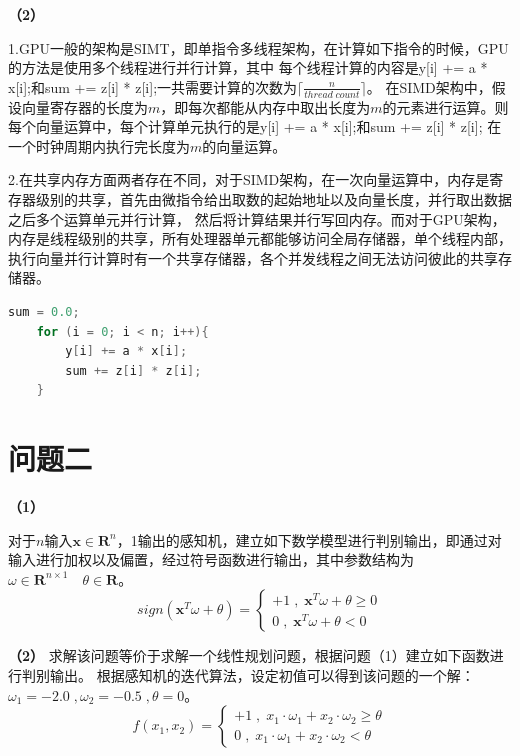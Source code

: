 \documentclass[12pt]{article}
\begin{document}
\textbf{（2）}

1.GPU一般的架构是SIMT，即单指令多线程架构，在计算如下指令的时候，GPU的方法是使用多个线程进行并行计算，其中
每个线程计算的内容是y[i] += a * x[i];和sum += z[i] * z[i];\;一共需要计算的次数为$\lceil \frac{n}{thread \; count}\rceil $。
在SIMD架构中，假设向量寄存器的长度为$m$，即每次都能从内存中取出长度为$m$的元素进行运算。则每个向量运算中，每个计算单元执行的是y[i] += a * x[i];和sum += z[i] * z[i];\;
在一个时钟周期内执行完长度为$m$的向量运算。

2.在共享内存方面两者存在不同，对于SIMD架构，在一次向量运算中，内存是寄存器级别的共享，首先由微指令给出取数的起始地址以及向量长度，并行取出数据之后多个运算单元并行计算，
然后将计算结果并行写回内存。而对于GPU架构，内存是线程级别的共享，所有处理器单元都能够访问全局存储器，单个线程内部，执行向量并行计算时有一个共享存储器，各个并发线程之间无法访问彼此的共享存储器。
\begin{lstlisting}[language=C++]
    sum = 0.0;
    for (i = 0; i < n; i++){
        y[i] += a * x[i];
        sum += z[i] * z[i];
    }
\end{lstlisting}
\section{问题二}
\textbf{（1）}

对于$n$输入$\mathbf{x}\in \mathbf{R} ^{n}$，1输出的感知机，建立如下数学模型进行判别输出，即通过对输入进行加权以及偏置，经过符号函数进行输出，其中参数结构为$\omega\in\mathbf{R}^{n\times 1}\quad\theta \in \mathbf{R}$。
\begin{equation}
    sign(\mathbf{x}^{T}\omega+\theta)=\begin{cases}
        +1\;,\;\mathbf{x}^{T}\omega+\theta \geq 0\\
        0\;,\;\mathbf{x}^{T}\omega+\theta<0
    \end{cases}
\end{equation}

\textbf{（2）}
求解该问题等价于求解一个线性规划问题，根据问题（1）建立如下函数进行判别输出。
根据感知机的迭代算法，设定初值可以得到该问题的一个解：$\omega_1=-2.0\;,\omega_2=-0.5\;,\theta=0$。
\begin{equation}
    f(x_1,x_2)=\begin{cases}
        +1\;,\;x_1\cdot\omega_1+x_2\cdot\omega_2\geq\theta\\
        0\;,\;x_1\cdot\omega_1+x_2\cdot\omega_2<\theta
    \end{cases}
\end{equation}
\end{document}
